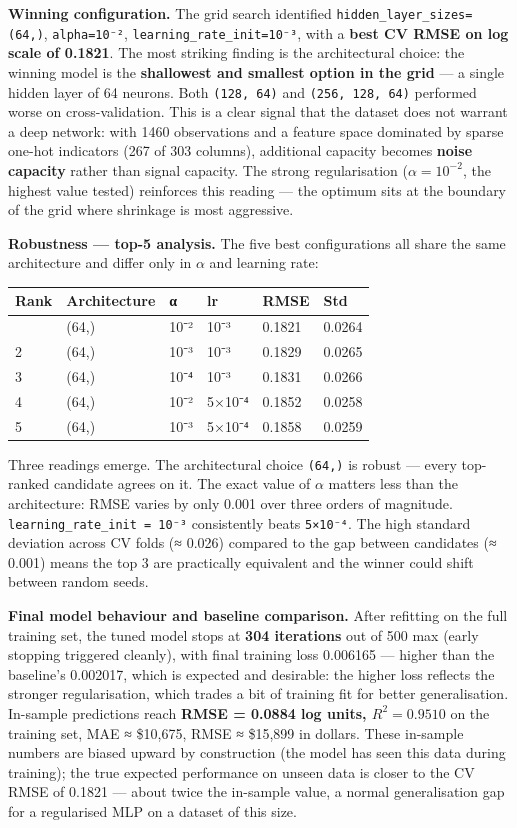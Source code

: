 \textbf{Winning configuration.} The grid search identified
\texttt{hidden\_layer\_sizes=(64,)}, \texttt{alpha=10⁻²},
\texttt{learning\_rate\_init=10⁻³}, with a \textbf{best CV RMSE on log
scale of 0.1821}. The most striking finding is the architectural choice:
the winning model is the \textbf{shallowest and smallest option in the
grid} --- a single hidden layer of 64 neurons. Both \texttt{(128,\ 64)}
and \texttt{(256,\ 128,\ 64)} performed worse on cross-validation. This
is a clear signal that the dataset does not warrant a deep network: with
1460 observations and a feature space dominated by sparse one-hot
indicators (267 of 303 columns), additional capacity becomes
\textbf{noise capacity} rather than signal capacity. The strong
regularisation (\(\alpha = 10^{-2}\), the highest value tested)
reinforces this reading --- the optimum sits at the boundary of the grid
where shrinkage is most aggressive.

\textbf{Robustness --- top-5 analysis.} The five best configurations all
share the same architecture and differ only in \(\alpha\) and learning
rate:

\begin{longtable}[]{@{}llllll@{}}
\toprule\noalign{}
Rank & Architecture & α & lr & RMSE & Std \\
\midrule\noalign{}
\endhead
\bottomrule\noalign{}
\endlastfoot
1 & (64,) & 10⁻² & 10⁻³ & 0.1821 & 0.0264 \\
2 & (64,) & 10⁻³ & 10⁻³ & 0.1829 & 0.0265 \\
3 & (64,) & 10⁻⁴ & 10⁻³ & 0.1831 & 0.0266 \\
4 & (64,) & 10⁻² & 5×10⁻⁴ & 0.1852 & 0.0258 \\
5 & (64,) & 10⁻³ & 5×10⁻⁴ & 0.1858 & 0.0259 \\
\end{longtable}

Three readings emerge. The architectural choice \texttt{(64,)} is robust
--- every top-ranked candidate agrees on it. The exact value of
\(\alpha\) matters less than the architecture: RMSE varies by only 0.001
over three orders of magnitude. \texttt{learning\_rate\_init\ =\ 10⁻³}
consistently beats \texttt{5×10⁻⁴}. The high standard deviation across
CV folds (≈ 0.026) compared to the gap between candidates (≈ 0.001)
means the top 3 are practically equivalent and the winner could shift
between random seeds.

\textbf{Final model behaviour and baseline comparison.} After refitting
on the full training set, the tuned model stops at \textbf{304
iterations} out of 500 max (early stopping triggered cleanly), with
final training loss 0.006165 --- higher than the baseline's 0.002017,
which is expected and desirable: the higher loss reflects the stronger
regularisation, which trades a bit of training fit for better
generalisation. In-sample predictions reach \textbf{RMSE = 0.0884 log
units, \(R^2 = 0.9510\)} on the training set, MAE ≈ \$10,675, RMSE ≈
\$15,899 in dollars. These in-sample numbers are biased upward by
construction (the model has seen this data during training); the true
expected performance on unseen data is closer to the CV RMSE of 0.1821
--- about twice the in-sample value, a normal generalisation gap for a
regularised MLP on a dataset of this size.

